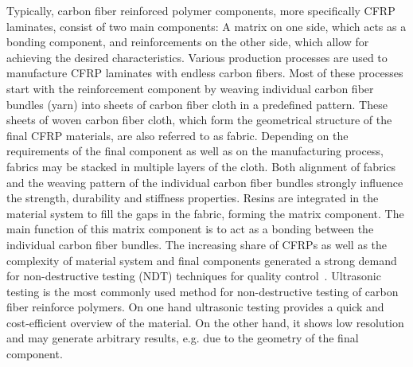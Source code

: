 Typically, carbon fiber reinforced polymer components, more specifically CFRP laminates, consist of two main components:
A matrix on one side, which acts as a bonding component, and  reinforcements on the other side, which allow for achieving the desired characteristics.  Various production processes are used to manufacture CFRP laminates with endless carbon fibers. Most of these processes start with the reinforcement component by weaving individual carbon fiber bundles (yarn) into sheets of carbon fiber cloth in a predefined pattern. These sheets of woven carbon fiber cloth, which form the geometrical structure of the final CFRP materials, are also referred to as fabric. Depending on the requirements of the final component as well as on the manufacturing process, fabrics may be stacked in multiple layers of the cloth. Both alignment of fabrics and the weaving pattern of the individual carbon fiber bundles strongly influence the strength, durability and stiffness properties. Resins are integrated in the material system to fill the gaps in the fabric, forming the matrix component. The main function of this matrix component is to act as a bonding between the individual carbon fiber bundles. 
The increasing share of CFRPs as well as the complexity of material system and final components generated a strong demand for non-destructive testing (NDT) techniques for quality control~\cite{Red2012}. Ultrasonic testing is the most commonly used method for non-destructive testing of carbon fiber reinforce polymers. On one hand ultrasonic testing provides a quick and cost-efficient overview of the material. On the other hand, it shows low resolution and may generate arbitrary results, e.g. due to the geometry of the final component. 

